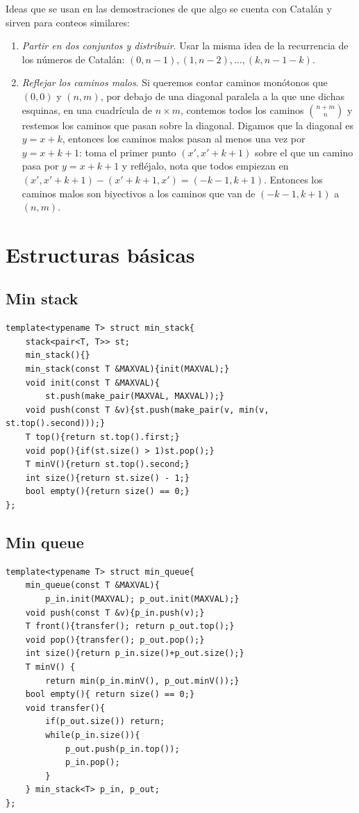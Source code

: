 \documentclass[10pt,spanish,mexico]{article}
\numberwithin{equation}{section}
\begin{document}
\begin{multicols}{2}
Ideas que se usan en las demostraciones de que algo se cuenta con Catalán y sirven para conteos similares:
\begin{enumerate}[1.]
    \item \textit{Partir en dos conjuntos y distribuir}. Usar la misma idea de la recurrencia de los números de Catalán: $(0, n - 1), (1, n - 2), \dots, (k, n - 1 - k)$.
    \item \textit{Reflejar los caminos malos}. Si queremos contar caminos monótonos que $(0, 0)$ y $(n, m)$, por debajo de una diagonal paralela a la que une dichas esquinas, en una cuadrícula de $n \times m$, contemos todos los caminos $\binom{n + m}{n}$ y restemos los caminos que pasan sobre la diagonal. Digamos que la diagonal es $y = x + k$, entonces los caminos malos pasan al menos una vez por $y = x + k + 1$: toma el primer punto $(x', x' + k + 1)$ sobre el que un camino pasa por $y = x + k + 1$ y refléjalo, nota que todos empiezan en $(x', x' + k + 1) - (x' + k + 1, x') = (- k - 1, k + 1)$. Entonces los caminos malos son biyectivos a los caminos que van de $(- k - 1, k + 1)$ a $(n, m)$.
\end{enumerate}

\hrulefill
\section{Estructuras básicas}
\subsection{Min stack}
\begin{verbatim}
template<typename T> struct min_stack{
    stack<pair<T, T>> st;
    min_stack(){}
    min_stack(const T &MAXVAL){init(MAXVAL);}
    void init(const T &MAXVAL){
        st.push(make_pair(MAXVAL, MAXVAL));}
    void push(const T &v){st.push(make_pair(v, min(v, st.top().second)));}
    T top(){return st.top().first;}
    void pop(){if(st.size() > 1)st.pop();}
    T minV(){return st.top().second;}
    int size(){return st.size() - 1;}
    bool empty(){return size() == 0;}
};
\end{verbatim}

\vspace{-1.2\baselineskip}
\hrulefill
\subsection{Min queue}
\begin{verbatim}
template<typename T> struct min_queue{
    min_queue(const T &MAXVAL){
        p_in.init(MAXVAL); p_out.init(MAXVAL);}
    void push(const T &v){p_in.push(v);}
    T front(){transfer(); return p_out.top();}
    void pop(){transfer(); p_out.pop();}
    int size(){return p_in.size()+p_out.size();}
    T minV() {
        return min(p_in.minV(), p_out.minV());}
    bool empty(){ return size() == 0;}
    void transfer(){
        if(p_out.size()) return;
        while(p_in.size()){
            p_out.push(p_in.top());
            p_in.pop();
        }
    } min_stack<T> p_in, p_out;
};
\end{verbatim}


\end{multicols}
\end{document}

